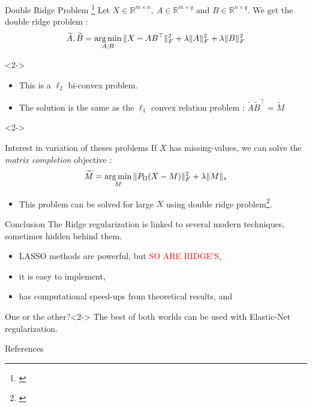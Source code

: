 \documentclass[10pt,aspectratio=43]{beamer}
\begin{document}
\begin{frame}{Double Ridge Problem \footnote[frame]{\citet{srebro2005maximum}}}{}
    Let $X \in \mathbb{R}^{m\times n },~  A \in \mathbb{R}^{m\times q}$ and $B \in \mathbb{R}^{n \times q }$. We get the double ridge problem :
    $$ \widetilde{A}, \widetilde{B} =  \mathop{\mathrm{arg\,min}}_{A, B} \|X-AB^\top \|_F^2 + \lambda \|A \|_F^2 +\lambda \|B \|_F^2 $$
    \begin{onlyenv}<2->
        \begin{itemize}
            \item This is a $\ell_2$ bi-convex problem.
            \item The solution is the same as the $\ell_1$ convex relation problem  :
            $ \widetilde{A} \widetilde{B}^\top = \widetilde{M} $
        \end{itemize}
    \end{onlyenv}
    \begin{onlyenv}<2->
        \begin{block}{Interest in variation of theses  problems}
            If $X$ has missing-values, we can solve the \textit{matrix completion} objective :
            $$\widetilde{M} = \mathop{\mathrm{arg\,min}}_{M} \|P_\Omega (X-M)\|_F^2 + \lambda \|M\|_*$$
        \end{block}
        \begin{itemize}
            \item This problem can be solved for large $X$ using double ridge problem\footnote[frame]{\citet{hastie2015matrix}}.
        \end{itemize}
    \end{onlyenv}
\end{frame}


\begin{frame}{Conclusion}
The Ridge regularization is linked to several modern techniques, sometimes hidden behind them.

\begin{itemize}
    \item LASSO methods are powerful, but \textcolor{red}{SO ARE RIDGE'S},
    \item it is easy to implement,
    \item has computational speed-ups from theoretical results, and
\end{itemize}
\medskip
    \begin{block}{One or the other?}<2->
    The best of both worlds can be used with Elastic-Net regularization.
    \end{block}
\end{frame}



\begin{frame}[allowframebreaks]{References}
    \small
    
\end{frame}
\end{document}
